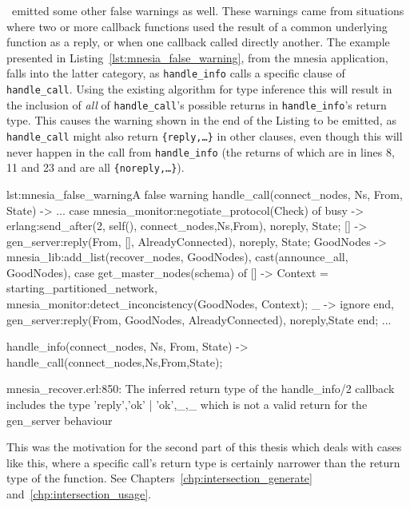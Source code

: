 \dr\ emitted some other false warnings as well. These warnings came
from situations where two or more callback functions used the result
of a common underlying function as a reply, or when one callback
called directly another. The example presented in
Listing~\ref{lst:mnesia_false_warning}, from the mnesia application,
falls into the latter category, as \texttt{handle\_info} calls a
specific clause of \texttt{handle\_call}. Using the existing algorithm
for type inference this will result in the inclusion of \emph{all} of
\texttt{handle\_call}'s possible returns in \texttt{handle\_info}'s
return type. This causes the warning shown in the end of the Listing
to be emitted, as \texttt{handle\_call} might also return
\texttt{\{reply,\ldots\}} in other clauses, even though this will
never happen in the call from \texttt{handle\_info} (the returns of
which are in lines 8, 11 and 23 and are all
\texttt{\{noreply,\ldots\}}).

\begin{code}{lst:mnesia_false_warning}{A false warning}
handle_call({connect_nodes, Ns}, From, State) ->
    ...
    case mnesia_monitor:negotiate_protocol(Check) of
	busy -> 
	    erlang:send_after(2, self(), {connect_nodes,Ns,From}),
	    {noreply, State};
	[] ->
	    gen_server:reply(From, {[], AlreadyConnected}),
	    {noreply, State};
	GoodNodes ->
	    mnesia_lib:add_list(recover_nodes, GoodNodes),
	    cast({announce_all, GoodNodes}),
	    case get_master_nodes(schema) of 
		[] ->
		    Context = starting_partitioned_network,
		    mnesia_monitor:detect_inconcistency(GoodNodes, Context);
		_ -> %
		    ignore
	    end,
	    gen_server:reply(From, {GoodNodes, AlreadyConnected}),
	    {noreply,State}
    end;
...

handle_info({connect_nodes, Ns, From}, State) ->
    handle_call({connect_nodes,Ns},From,State);


mnesia_recover.erl:850: The inferred return type of the handle_info/2
callback includes the type {'reply','ok' | {'ok',_},_} which is not a
valid return for the gen_server behaviour

\end{code}

This was the motivation for the second part of this thesis which deals
with cases like this, where a specific call's return type is certainly
narrower than the return type of the function. See
Chapters~\ref{chp:intersection_generate}
and~\ref{chp:intersection_usage}.

